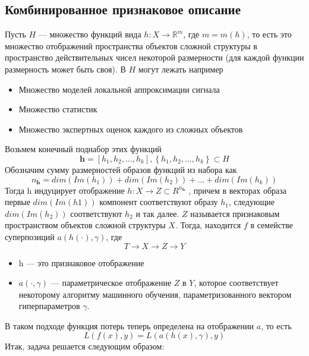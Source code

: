 \documentclass[a4paper,14pt]{extarticle}
\numberwithin{equation}{section}
\begin{document}
	\subsection*{Комбинированное признаковое описание}
	Пусть $H$ --- множество функций вида $h : X \rightarrow \mathbb{R}^m$, где $m = m(h)$, то есть это множество отображений пространства объектов сложной структуры в пространство действительных чисел некоторой размерности (для каждой функции размерность может быть своя). В $H$ могут лежать например
	\begin{itemize}
		\item Множество моделей локальной аппроксимации сигнала
		\item Множество статистик
		\item Множество экспертных оценок каждого из сложных объектов
	\end{itemize}
	Возьмем конечный поднабор этих функций
	\begin{equation}
	\mathbf{h} = [h_1,h_2,\dots,h_k], \left\lbrace h_1,h_2,\dots,h_k \right\rbrace \subset H
	\end{equation}
	Обозначим сумму размерностей образов функций из набора как
	\begin{equation}
		n_\mathbf{h} = dim(Im(h_1))+dim(Im(h_2))+\dots+dim(Im(h_k))
	\end{equation}
	Тогда h индуцирует отображение  $h : X \rightarrow Z \subset R^{n_\mathbf{h}}$ , причем в векторах образа первые $dim(Im(h1))$ компонент соответствуют образу $h_1$, следующие $dim(Im(h_2))$ соответствуют $h_2$ и так далее. $Z$ называется признаковым пространством объектов сложной структуры $X$. Тогда, находится $f$ в семействе суперпозиций $a(h(\cdot), \gamma)$, где
	\begin{equation}
	T\rightarrow X\rightarrow Z \rightarrow Y
	\end{equation}
	\begin{itemize}
		\item h --- это признаковое отображение
		\item $a(\cdot,\gamma)$ — параметрическое отображение $Z$ в $Y$, которое соответствует некоторому алгоритму машинного обучения, параметризованного вектором гиперпараметров $\gamma$.
	\end{itemize}
В таком подходе функция потерь теперь определена на отображении $a$, то есть
\begin{equation}
L(f(x),y) = L(a(h(x),\gamma),y)
\end{equation}
Итак, задача решается следующим образом: 
\end{document}
